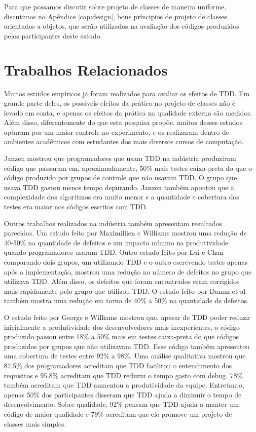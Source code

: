 Para que possamos discutir sobre projeto de classes de maneira uniforme,
discutimos no Apêndice \ref{cap:design},
bons príncipios de projeto de classes orientados a objetos, que serão utilizados
na avaliação dos códigos produzidos pelos participantes deste estudo.

\section{Trabalhos Relacionados}
\label{cap:trabalhos-relacionados}

Muitos estudos empíricos já foram realizados para avaliar os efeitos de TDD.
Em grande parte deles, os possíveis efeitos da prática no projeto de classes não é 
levado em conta, e apenas os efeitos da prática na qualidade externa são medidos.
Além disso, diferentemente
do que esta pesquisa propõe, muitos desses estudos optaram por um
maior controle no experimento, e os realizaram dentro de ambientes acadêmicos 
com estudantes dos mais diversos cursos de computação.

Janzen \cite{janzen-arch-improvement} mostrou que programadores que usam TDD na 
indústria produziram código que passaram em, aproximadamente, 50\% mais testes 
caixa-preta do que o código produzido por grupos de controle que não usavam TDD.
O grupo que usava TDD gastou menos tempo depurando. Janzen também 
apontou que a complexidade dos algoritmos era muito menor e a quantidade e
cobertura dos testes era maior nos códigos escritos com TDD.

Outros trabalhos realizados na indústria também apresentam resultados parecidos.
Um estudo feito por Maximillien e Williams \cite{max-e-williams} mostrou uma
redução de 40-50\% na quantidade de defeitos e um impacto mínimo na
produtividade quando programadores usaram TDD. Outro estudo feito por Lui e
Chan \cite{lui-e-chan} comparando dois grupos, um utilizando TDD e o outro 
escrevendo testes apenas após a implementação, mostrou uma redução  
no número de defeitos no grupo que utilizava TDD. 
Além disso, os defeitos que foram encontrados eram 
corrigidos mais rapidamente pelo grupo que utilizou TDD. O estudo feito por 
Damm et al \cite{damn-lundberg-e-olson} também mostra uma redução
em torno de 40\% a 50\% na quantidade de defeitos.

O estudo feito por George e Williams \cite{george-e-williams} mostrou que,
apesar de TDD poder reduzir inicialmente a produtividade dos desenvolvedores 
mais inexperientes, o código produzido passou entre 18\% a 50\% mais em testes 
caixa-preta do que códigos produzidos por grupos que não utilizavam TDD. Esse
código também apresentou uma cobertura de testes entre 92\% a 98\%. Uma análise
qualitativa mostrou que 87.5\% dos programadores acreditam que TDD facilitou o 
entendimento dos requisitos e 95.8\% acreditam que TDD reduziu o tempo gasto com
debug. 78\% também acreditam que TDD aumentou a produtividade da equipe. 
Entretanto, apenas 50\% dos participantes disseram que TDD ajuda a diminuir o tempo de 
desenvolvimento. Sobre qualidade, 92\% pensam que TDD ajuda a manter um
código de maior qualidade e 79\% acreditam que ele promove um projeto de classes mais simples.

